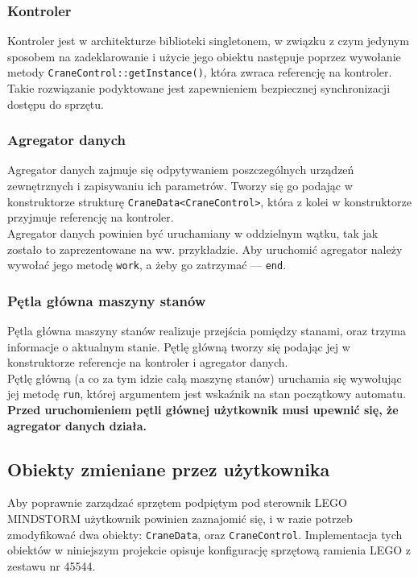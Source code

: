 \documentclass{article}
\begin{document}
\subsubsection*{Kontroler}
Kontroler jest w architekturze biblioteki singletonem, w związku z czym jedynym
sposobem na zadeklarowanie i użycie jego obiektu następuje poprzez wywołanie
metody \texttt{CraneControl::getInstance()}, która zwraca referencję na
kontroler. Takie rozwiązanie podyktowane jest zapewnieniem bezpiecznej
synchronizacji dostępu do sprzętu.
\subsubsection*{Agregator danych}
Agregator danych zajmuje się odpytywaniem poszczególnych urządzeń zewnętrznych i
zapisywaniu ich parametrów. Tworzy się go podając w konstruktorze
strukturę \texttt{CraneData<CraneControl>}, która z kolei w konstruktorze
przyjmuje referencję na kontroler.\\
Agregator danych powinien być uruchamiany w oddzielnym wątku, tak jak zostało to
zaprezentowane na ww. przykładzie. Aby uruchomić agregator należy wywołać jego
metodę \texttt{work}, a żeby go zatrzymać --- \texttt{end}.
\subsubsection*{Pętla główna maszyny stanów}
Pętla główna maszyny stanów realizuje przejścia pomiędzy stanami, oraz trzyma
informacje o aktualnym stanie. Pętlę główną tworzy się podając jej w
konstruktorze referencje na kontroler i agregator danych.\\
Pętlę główną (a co za tym idzie całą maszynę stanów) uruchamia się wywołując jej
metodę \texttt{run}, której argumentem jest wskaźnik na stan początkowy
automatu. \textbf{Przed uruchomieniem pętli głównej użytkownik musi upewnić się,
że agregator danych działa.}
\subsection{Obiekty zmieniane przez użytkownika}\label{modifiable}
Aby poprawnie zarządzać sprzętem podpiętym pod sterownik LEGO MINDSTORM
użytkownik powinien zaznajomić się, i w razie potrzeb zmodyfikować dwa obiekty:
\texttt{CraneData}, oraz \texttt{CraneControl}. Implementacja tych obiektów w
niniejszym projekcie opisuje konfigurację sprzętową ramienia LEGO z zestawu nr
45544.
\end{document}

